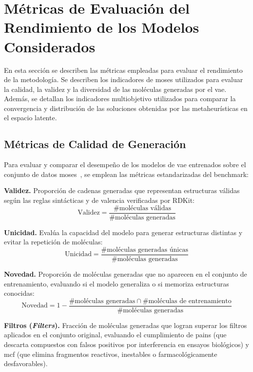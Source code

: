 \section{Métricas de Evaluación del Rendimiento de los Modelos Considerados}
\label{sec:metricas_evaluacion}

En esta sección se describen las métricas empleadas para evaluar el rendimiento de la metodología. Se describen los indicadores de \gls{moses} utilizados para evaluar la calidad, la validez y la diversidad de las moléculas generadas por el \gls{vae}. Además, se detallan los indicadores multiobjetivo utilizados para comparar la convergencia y distribución de las soluciones obtenidas por las metaheurísticas en el espacio latente.

\subsection{Métricas de Calidad de Generación}
\label{subsec:metricas_moses}
\label{subsec:metricas_calidad_generacion}

Para evaluar y comparar el desempeño de los modelos de \gls{vae} entrenados sobre el conjunto de datos \gls{moses}~\cite{polykovskiy2020molecular}, se emplean las métricas estandarizadas del benchmark:

\textbf{Validez.} Proporción de cadenas generadas que representan estructuras válidas según las reglas sintácticas y de valencia verificadas por RDKit:
\begin{equation}
    \text{Validez} = \frac{\# \text{moléculas válidas}}{\# \text{moléculas generadas}}
\end{equation}

\textbf{Unicidad.} Evalúa la capacidad del modelo para generar estructuras distintas y evitar la repetición de moléculas:
\begin{equation}
    \text{Unicidad} = \frac{\# \text{moléculas generadas únicas}}{\# \text{moléculas generadas}}
\end{equation}

\textbf{Novedad.} Proporción de moléculas generadas que no aparecen en el conjunto de entrenamiento, evaluando si el modelo generaliza o si memoriza estructuras conocidas:
\begin{equation}
    \text{Novedad} = 1 - \frac{\# \text{moléculas generadas} \cap \# \text{moléculas de entrenamiento}}{\# \text{moléculas generadas}}
\end{equation}

\textbf{Filtros (\textit{Filters}).} Fracción de moléculas generadas que logran superar los filtros aplicados en el conjunto original, evaluando el cumplimiento de \acrshort{pains} (que descarta compuestos con falsos positivos por interferencia en ensayos biológicos) y \acrshort{mcf} (que elimina fragmentos reactivos, inestables o farmacológicamente desfavorables).


